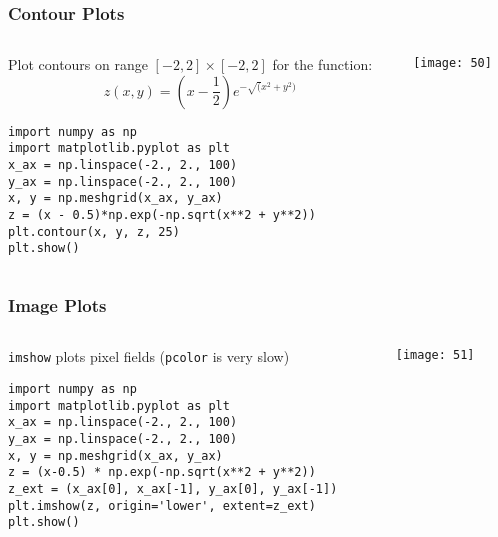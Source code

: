 \begin{frame}[fragile]\frametitle{Contour Plots}

\begin{columns}
    \begin{column}[T]{0.6\linewidth}
    Plot contours on range $[-2,2]\times[-2,2]$ for the function:
    \[ z(x, y) = \left(x - \frac{1}{2}\right) e^{-\sqrt(x^2 + y^2)} \]
    \begin{lstlisting}
import numpy as np
import matplotlib.pyplot as plt
x_ax = np.linspace(-2., 2., 100)
y_ax = np.linspace(-2., 2., 100)
x, y = np.meshgrid(x_ax, y_ax)
z = (x - 0.5)*np.exp(-np.sqrt(x**2 + y**2))
plt.contour(x, y, z, 25)
plt.show()
    \end{lstlisting}
    \end{column}
    \begin{column}[T]{0.4\linewidth}
\begin{center}
\texttt{[image: 50]}
\end{center}
    \end{column}
  \end{columns}
  
  


\end{frame}

\begin{frame}[fragile]\frametitle{Image Plots}

\begin{columns}
    \begin{column}[T]{0.6\linewidth}
    \lstinline|imshow| plots pixel fields (\lstinline|pcolor| is very slow)
    \begin{lstlisting}
import numpy as np
import matplotlib.pyplot as plt
x_ax = np.linspace(-2., 2., 100)
y_ax = np.linspace(-2., 2., 100)
x, y = np.meshgrid(x_ax, y_ax)
z = (x-0.5) * np.exp(-np.sqrt(x**2 + y**2))
z_ext = (x_ax[0], x_ax[-1], y_ax[0], y_ax[-1])
plt.imshow(z, origin='lower', extent=z_ext)
plt.show()
    \end{lstlisting}

    \end{column}
    \begin{column}[T]{0.4\linewidth}
\begin{center}
\texttt{[image: 51]}
\end{center}
    \end{column}
  \end{columns}
  


\end{frame}

